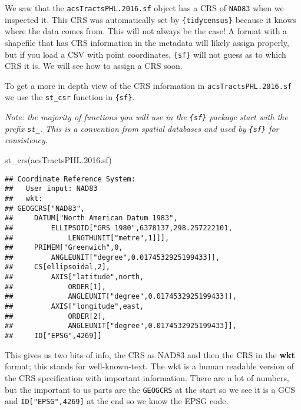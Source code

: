 \documentclass[
]{article}
\newenvironment{Shaded}{\begin{snugshade}}{\end{snugshade}}
\newcommand{\FloatTok}[1]{\textcolor[rgb]{0.00,0.00,0.81}{#1}}
\newcommand{\FunctionTok}[1]{\textcolor[rgb]{0.00,0.00,0.00}{#1}}
\newcommand{\NormalTok}[1]{#1}
\begin{document}
We saw that the \texttt{acsTractsPHL.2016.sf} object has a CRS of
\texttt{NAD83} when we inspected it. This CRS was automatically set by
\texttt{\{tidycensus\}} because it knows where the data comes from. This
will not always be the case! A format with a shapefile that has CRS
information in the metadata will likely assign properly, but if you load
a CSV with point coordinates, \texttt{\{sf\}} will not guess as to which
CRS it is. We will see how to assign a CRS soon.

To get a more in depth view of the CRS information in
\texttt{acsTractsPHL.2016.sf} we use the \texttt{st\_csr} function in
\texttt{\{sf\}}.

\emph{Note: the majority of functions you will use in the
\texttt{\{sf\}} package start with the prefix \texttt{st\_}. This is a
convention from spatial databases and used by \texttt{\{sf\}} for
consistency.}

\begin{Shaded}
\begin{Highlighting}[]
\FunctionTok{st\_crs}\NormalTok{(acsTractsPHL.}\FloatTok{2016.}\NormalTok{sf)}
\end{Highlighting}
\end{Shaded}

\begin{verbatim}
## Coordinate Reference System:
##   User input: NAD83 
##   wkt:
## GEOGCRS["NAD83",
##     DATUM["North American Datum 1983",
##         ELLIPSOID["GRS 1980",6378137,298.257222101,
##             LENGTHUNIT["metre",1]]],
##     PRIMEM["Greenwich",0,
##         ANGLEUNIT["degree",0.0174532925199433]],
##     CS[ellipsoidal,2],
##         AXIS["latitude",north,
##             ORDER[1],
##             ANGLEUNIT["degree",0.0174532925199433]],
##         AXIS["longitude",east,
##             ORDER[2],
##             ANGLEUNIT["degree",0.0174532925199433]],
##     ID["EPSG",4269]]
\end{verbatim}

This gives us two bits of info, the CRS as NAD83 and then the CRS in the
\textbf{wkt} format; this stands for well-known-text. The wkt is a human
readable version of the CRS specification with important information.
There are a lot of numbers, but the important to us parts are the
\texttt{GEOGCRS} at the start so we see it is a GCS and
\texttt{ID{[}"EPSG",4269{]}} at the end so we know the EPSG code.
\end{document}
